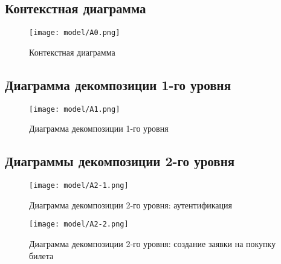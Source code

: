 \subsection{Контекстная диаграмма}

\begin{figure}[H]
    \centering
    \texttt{[image: model/A0.png]}
    \caption{Контекстная диаграмма}
\end{figure}

\newpage
\subsection{Диаграмма декомпозиции 1-го уровня}

\begin{figure}[H]
    \centering
    \texttt{[image: model/A1.png]}
    \caption{Диаграмма декомпозиции 1-го уровня}
\end{figure}

\newpage
\subsection{Диаграммы декомпозиции 2-го уровня}

\begin{figure}[H]
    \centering
    \texttt{[image: model/A2-1.png]}
    \caption{Диаграмма декомпозиции 2-го уровня: аутентификация}
\end{figure}

\newpage
\begin{figure}[H]
    \centering
    \texttt{[image: model/A2-2.png]}
    \caption{Диаграмма декомпозиции 2-го уровня: создание заявки на покупку билета}
\end{figure}
